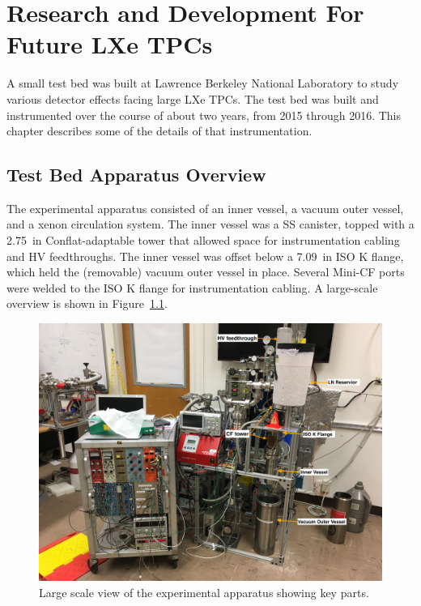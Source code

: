 \chapter{Research and Development For Future LXe TPCs}

\label{ch:testbed} %

A small test bed was built at Lawrence Berkeley National Laboratory to study various detector effects facing large \ac{LXe} \ac{TPC}s. The test bed was built and instrumented over the course of about two years, from 2015 through 2016. This chapter describes some of the details of that instrumentation.

\section{Test Bed Apparatus Overview}
The experimental apparatus consisted of an inner vessel, a vacuum outer vessel, and a xenon circulation system. The inner vessel was a \ac{SS} canister, topped with a 2.75~in Conflat-adaptable tower that allowed space for instrumentation cabling and \ac{HV} feedthroughs. The inner vessel was offset below a 7.09~in ISO K flange, which held the (removable) vacuum outer vessel in place. Several Mini-CF ports were welded to the ISO K flange for instrumentation cabling. A large-scale overview is shown in Figure~\ref{fig:apparatus}.

\begin{figure}[htbp]
\begin{center}
\includegraphics[width=\textwidth]{figures/testbed/apparatus.jpg}
\caption{Large scale view of the experimental apparatus showing key parts.}
\label{fig:apparatus}
\end{center}
\end{figure}


